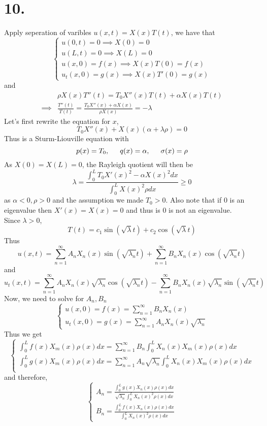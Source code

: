\documentclass[11pt]{article}
\theoremstyle{mystyle}
\theoremstyle{definition}
\begin{document}
\section*{10.}
Apply seperation of varibles $u(x,t) = X(x) T(t)$, we have that 
\[
  \begin{cases}
    u(0,t) = 0 \implies X(0) = 0 \\
    u(L,t) = 0 \implies X(L) = 0 \\
    u(x,0) = f(x) \implies X(x)T(0) = f(x) \\
    u_t(x,0) = g(x) \implies X(x)T'(0) = g(x)
  \end{cases}
\]
and 
\begin{align*}
  &\rho X(x)T''(t) = T_0 X''(x)T(t) + \alpha X(x)T(t) \\ 
  \implies & \displaystyle\frac{T''(t)}{T(t)} = \displaystyle\frac{T_0 X''(x) + \alpha X(x)}{\rho X(x)} = -\lambda 
\end{align*}
Let's first rewrite the equation for $x$, 
\[
  T_0 X''(x) + X(x) (\alpha + \lambda \rho) = 0
\]
Thus is a Sturm-Liouville equation with 
\[
  p(x) = T_0, \indent q(x) = \alpha, \indent \sigma(x) = \rho
\]
As $X(0) = X(L) = 0$, the Rayleigh quotient will then be 
\[
  \lambda = \displaystyle\frac{\int_0^L T_0 X'(x)^2 - \alpha X(x)^2 dx}{\int_0^L X(x)^2 \rho dx} \ge 0
\]
as $\alpha < 0, \rho >0$ and the assumption we made $T_0 > 0$. Also note that if $0$ is an eigenvalue then $X'(x) = X(x) = 0$ and thus is $0$ is not an eigenvalue. \\ 
Since $\lambda > 0$, 
\[
  T(t) = c_1 \sin(\sqrt{\lambda}t) + c_2 \cos(\sqrt{\lambda}t)
\]
Thus 
\[
  u(x,t) = \sum_{n=1}^\infty A_n X_n(x) \sin(\sqrt{\lambda_n}t) + \sum_{n=1}^\infty B_n X_n(x) \cos(\sqrt{\lambda_n}t) 
\]
and 
\[
  u_t(x,t) = \sum_{n=1}^\infty A_n X_n(x) \sqrt{\lambda_n} \cos(\sqrt{\lambda_n}t) - \sum_{n=1}^\infty B_n X_n(x) \sqrt{\lambda_n} \sin(\sqrt{\lambda_n}t) 
\]
Now, we need to solve for $A_n, B_n$
\[
  \begin{cases}
    u(x,0) = f(x) = \sum_{n=1}^\infty B_n X_n(x) \\
    u_t(x,0) = g(x) = \sum_{n=1}^\infty A_n X_n(x) \sqrt{\lambda_n}
  \end{cases}
\]
Thus we get 
\[
  \begin{cases}
    \int_0^L f(x)X_m(x) \rho(x) dx = \sum_{n=1}^\infty B_n \int_0^L X_n(x) X_m(x) \rho(x)dx \\
    \int_0^L g(x)X_m(x) \rho(x) dx = \sum_{n=1}^\infty A_n \sqrt{\lambda_n} \int_0^L X_n(x) X_m(x) \rho(x)dx \\
  \end{cases}
\]
and therefore, 
\[
  \begin{cases}
    A_n = \displaystyle\frac{\int_0^L g(x) X_n(x) \rho(x) dx}{\sqrt{\lambda_n} \int_0^L X_n(x)^2 \rho(x) dx} \\
    B_n = \displaystyle\frac{\int_0^L f(x) X_n(x) \rho(x) dx}{\int_0^L X_n(x)^2 \rho(x) dx}
  \end{cases}
\]
\end{document}
